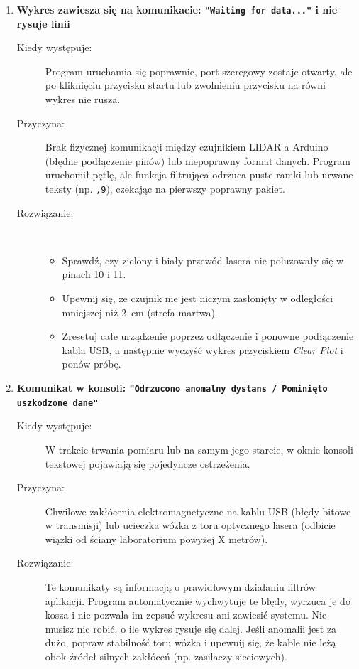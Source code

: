 \documentclass[a4paper,12pt]{article}
\begin{document}
\begin{enumerate}
    \item \textbf{Wykres zawiesza się na komunikacie: \texttt{"Waiting for data..."} i nie rysuje linii}
    \begin{description}
        \item[Kiedy występuje:] Program uruchamia się poprawnie, port szeregowy zostaje otwarty, ale po kliknięciu przycisku startu lub zwolnieniu przycisku na równi wykres nie rusza.
        \item[Przyczyna:] Brak fizycznej komunikacji między czujnikiem LIDAR a Arduino (błędne podłączenie pinów) lub niepoprawny format danych. Program uruchomił pętlę, ale funkcja filtrująca odrzuca puste ramki lub urwane teksty (np. \texttt{,9}), czekając na pierwszy poprawny pakiet.
        \item[Rozwiązanie:] \
        \begin{itemize}
            \item Sprawdź, czy zielony i biały przewód lasera nie poluzowały się w pinach 10 i 11.
            \item Upewnij się, że czujnik nie jest niczym zasłonięty w odległości mniejszej niż 2~cm (strefa martwa).
            \item Zresetuj całe urządzenie poprzez odłączenie i ponowne podłączenie kabla USB, a następnie wyczyść wykres przyciskiem \textit{Clear Plot} i ponów próbę.
        \end{itemize}
    \end{description}

    \item \textbf{Komunikat w konsoli: \texttt{"Odrzucono anomalny dystans / Pominięto uszkodzone dane"}}
    \begin{description}
        \item[Kiedy występuje:] W trakcie trwania pomiaru lub na samym jego starcie, w oknie konsoli tekstowej pojawiają się pojedyncze ostrzeżenia.
        \item[Przyczyna:] Chwilowe zakłócenia elektromagnetyczne na kablu USB (błędy bitowe w transmisji) lub ucieczka wózka z toru optycznego lasera (odbicie wiązki od ściany laboratorium powyżej X metrów).
        \item[Rozwiązanie:] Te komunikaty są informacją o prawidłowym działaniu filtrów aplikacji. Program automatycznie wychwytuje te błędy, wyrzuca je do kosza i nie pozwala im zepsuć wykresu ani zawiesić systemu. Nie musisz nic robić, o ile wykres rysuje się dalej. Jeśli anomalii jest za dużo, popraw stabilność toru wózka i upewnij się, że kable nie leżą obok źródeł silnych zakłóceń (np. zasilaczy sieciowych).
    \end{description}
\end{enumerate}
\end{document}
